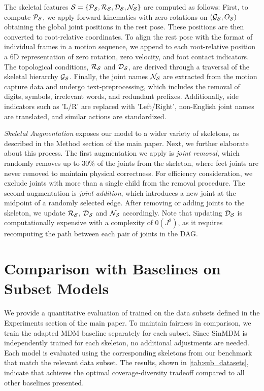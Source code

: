 The skeletal features
$\mathcal{S} = \{\mathcal{P}_{\mathcal{S}}, \mathcal{R}_{\mathcal{S}}, \mathcal{D}_{\mathcal{S}}, \mathcal{N}_{\mathcal{S}}\}$ are computed as follows: First, to compute $\mathcal{P}_{\mathcal{S}}$, we apply forward kinematics with zero rotations on $(\mathcal{G}_{\mathcal{S}}, O_{\mathcal{S}})$ obtaining the global joint positions in the rest pose. These positions are then converted to root-relative coordinates. To align the rest pose with the format of individual frames in a motion sequence, we append to each root-relative position a 6D representation of zero rotation, zero velocity, and foot contact indicators. The topological conditions, $\mathcal{R}_{\mathcal{S}}$ and $\mathcal{D}_{\mathcal{S}}$, are derived through a traversal of the skeletal hierarchy $\mathcal{G}_{\mathcal{S}}$. Finally, the joint names $\mathcal{N}_{\mathcal{S}}$ are extracted from the motion capture data and undergo text-preprocessing, which includes the removal of digits, symbols, irrelevant words, and redundant prefixes. Additionally, side indicators such as 'L/R' are replaced with 'Left/Right', non-English joint names are translated, and similar actions are standardized.



\emph{Skeletal Augmentation} exposes our model to a wider variety of skeletons, as described in the Method section of the main paper. Next, we further elaborate about this process. The first augmentation we apply is \emph{joint removal}, which randomly removes up to 30\% of the joints from the skeleton, where feet joints are never removed to maintain physical correctness. For efficiency consideration, we exclude joints with more than a single child from the removal procedure. The second augmentation is \emph{joint addition}, which introduces a new joint at the midpoint of a randomly selected edge.
After removing or adding joints to the skeleton, we update $\mathcal{R}_{\mathcal{S}}$, $\mathcal{D}_{\mathcal{S}}$ and $\mathcal{N}_{\mathcal{S}}$ accordingly. Note that updating $\mathcal{D}_{\mathcal{S}}$ is computationally expensive with a complexity of $0(J^2)$, as it requires recomputing the path between each pair of joints in the DAG. 

\section{Comparison with Baselines on Subset Models} \label{sec:comp_subset}

We provide a quantitative evaluation of \algoname trained on the data subsets defined in the Experiments section of the main paper. To maintain fairness in comparison, we train the adapted MDM baseline separately for each subset. Since SinMDM is independently trained for each skeleton, no additional adjustments are needed. Each model is evaluated using the corresponding skeletons from our benchmark that match the relevant data subset. The results, shown in \cref{tab:sub_datasets}, indicate that \algoname achieves the optimal coverage-diversity tradeoff compared to all other baselines presented.

